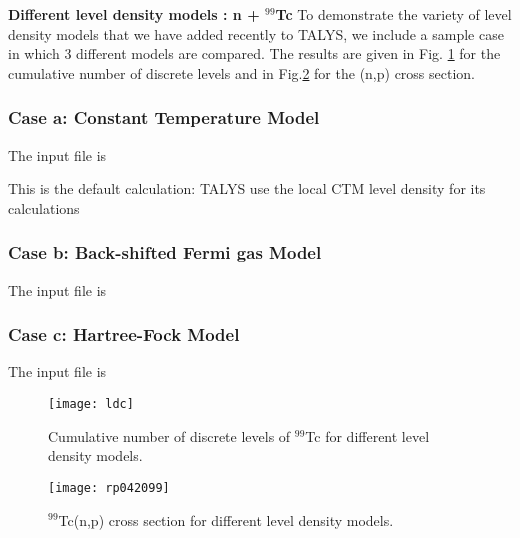 \begin{samplecase}
{\bf Different level density models : n + ${}^{99}$Tc}\newline
To demonstrate the variety of level density models that we have added 
recently to TALYS, we include a sample case in which 3 different models 
are compared. The results are given in Fig. \ref{tccum} for
the cumulative number of discrete levels and in Fig.\ref{tcnp} for the (n,p)
cross section.
\subsubsection{Case a: Constant Temperature Model}
The input file is


This is the default calculation: TALYS use the local CTM level density for
its calculations
\subsubsection{Case b: Back-shifted Fermi gas Model}
The input file is


\subsubsection{Case c: Hartree-Fock Model}
The input file is


\end{samplecase}
\begin{figure}
\centering\texttt{[image: ldc]}
\caption{Cumulative number of discrete levels of $^{99}$Tc for different 
level density models.}
\label{tccum}
\end{figure}
\begin{figure}
\centering\texttt{[image: rp042099]}
\caption{$^{99}$Tc(n,p) cross section for different 
level density models.}
\label{tcnp}
\end{figure}
